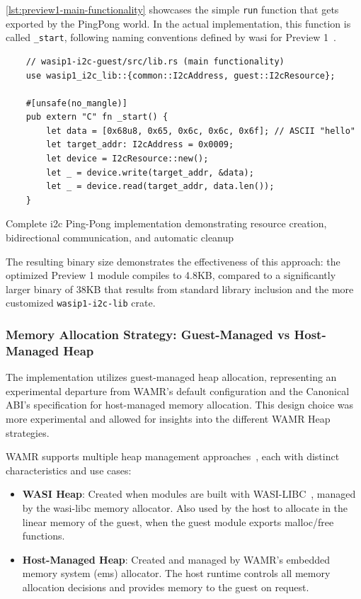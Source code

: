 \autoref{lst:preview1-main-functionality} showcases the simple \texttt{run} function that gets exported by the PingPong world. In the actual implementation, this function is called \texttt{\_start}, following naming conventions defined by \acrshort{wasi} for Preview 1~\cite{wasi_start_convention}.
\begin{listing}[H]
    \begin{verbatim}
    // wasip1-i2c-guest/src/lib.rs (main functionality)
    use wasip1_i2c_lib::{common::I2cAddress, guest::I2cResource};
    
    #[unsafe(no_mangle)]
    pub extern "C" fn _start() {
        let data = [0x68u8, 0x65, 0x6c, 0x6c, 0x6f]; // ASCII "hello"
        let target_addr: I2cAddress = 0x0009;
        let device = I2cResource::new();
        let _ = device.write(target_addr, &data);
        let _ = device.read(target_addr, data.len());
    }
    \end{verbatim}
    \caption{Complete \acrshort{i2c} Ping-Pong implementation demonstrating resource creation, bidirectional communication, and automatic cleanup}
    \label{lst:preview1-main-functionality}
\end{listing}

The resulting binary size demonstrates the effectiveness of this approach: the optimized Preview 1 module compiles to 4.8KB, compared to a significantly larger binary of 38KB that results from standard library inclusion and the more customized \texttt{wasip1-i2c-lib} crate.

\subsubsection{Memory Allocation Strategy: Guest-Managed vs Host-Managed Heap}

The implementation utilizes guest-managed heap allocation, representing an experimental departure from WAMR's default configuration and the Canonical ABI's specification for host-managed memory allocation. This design choice was more experimental and allowed for insights into the different WAMR Heap strategies. 

WAMR supports multiple heap management approaches~\cite{wamr_heaps}, each with distinct characteristics and use cases:

\begin{itemize}
    \item \textbf{WASI Heap}: Created when modules are built with WASI-LIBC~\cite{wasi_libc_git}, managed by the wasi-libc memory allocator. Also used by the host to allocate in the linear memory of the guest, when the guest module exports malloc/free functions.
    \item \textbf{Host-Managed Heap}: Created and managed by WAMR's embedded memory system (ems) allocator. The host runtime controls all memory allocation decisions and provides memory to the guest on request.
\end{itemize}

